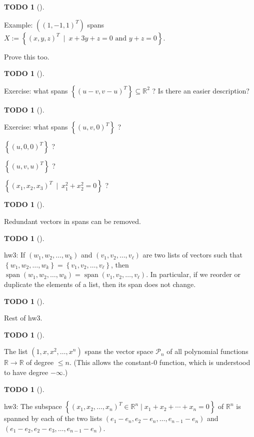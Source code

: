 \documentclass[numbers=enddot,12pt,final,onecolumn,notitlepage]{scrartcl}%
\theoremstyle{definition}
\newtheorem{quest}[theo]{TODO}
\newenvironment{todo}[1][]
{\begin{quest}[#1]\begin{leftbar}}
{\end{leftbar}\end{quest}}
\begin{document}
\begin{todo}
Example: $\left(  \left(  1,-1,1\right)  ^{T}\right)  $ spans $X:=\left\{
\left(  x,y,z\right)  ^{T}\ \mid\ x+3y+z=0\text{ and }y+z=0\right\}  $.

Prove this too.
\end{todo}

\begin{todo}
Exercise: what spans $\left\{  \left(  u-v,v-u\right)  ^{T}\right\}
\subseteq\mathbb{R}^{2}$ ? Is there an easier description?
\end{todo}

\begin{todo}
Exercise: what spans $\left\{  \left(  u,v,0\right)  ^{T}\right\}  $ ?

$\left\{  \left(  u,0,0\right)  ^{T}\right\}  $ ?

$\left\{  \left(  u,v,u\right)  ^{T}\right\}  $ ?

$\left\{  \left(  x_{1},x_{2},x_{3}\right)  ^{T}\ \mid\ x_{1}^{2}+x_{2}%
^{2}=0\right\}  $ ?
\end{todo}

\begin{todo}
Redundant vectors in spans can be removed.
\end{todo}

\begin{todo}
hw3: If $\left(  w_{1}, w_{2}, \ldots, w_{k}\right)  $ and $\left(  v_{1},
v_{2}, \ldots, v_{\ell}\right)  $ are two lists of vectors such that $\left\{
w_{1}, w_{2}, \ldots, w_{k}\right\}  = \left\{  v_{1}, v_{2}, \ldots, v_{\ell
}\right\}  $, then $\operatorname{span}\left(  w_{1}, w_{2}, \ldots,
w_{k}\right)  = \operatorname{span}\left(  v_{1}, v_{2}, \ldots, v_{\ell
}\right)  $. In particular, if we reorder or duplicate the elements of a list,
then its span does not change.
\end{todo}

\begin{todo}
Rest of hw3.
\end{todo}

\begin{todo}
The list $\left(  1, x, x^{2}, \ldots, x^{n}\right)  $ spans the vector space
$\mathcal{P}_{n}$ of all polynomial functions $\mathbb{R} \to\mathbb{R}$ of
degree $\leq n$. (This allows the constant-$0$ function, which is understood
to have degree $-\infty$.)
\end{todo}

\begin{todo}
hw3: The subspace $\left\{  \left(  x_{1},x_{2},\ldots,x_{n}\right)  ^{T}%
\in\mathbb{R}^{n}\mid x_{1}+x_{2}+\cdots+x_{n}=0\right\}  $ of $\mathbb{R}%
^{n}$ is spanned by each of the two lists $\left(  e_{1}-e_{n},e_{2}%
-e_{n},\ldots,e_{n-1}-e_{n}\right)  $ and $\left(  e_{1}-e_{2},e_{2}%
-e_{3},\ldots,e_{n-1}-e_{n}\right)  $.
\end{todo}
\end{document}
